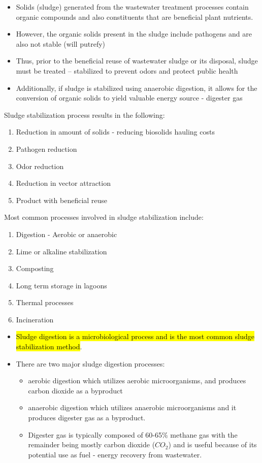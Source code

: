 \documentclass{article}
\begin{document}
		\begin{itemize}
		\item Solids (sludge) generated from the wastewater treatment processes contain organic compounds and also constituents that are beneficial plant nutrients. 
		\item However, the organic solids present in the sludge include pathogens and are also not stable (will putrefy)
		\item Thus, prior to the beneficial reuse of wastewater sludge or its disposal, sludge must be treated – stabilized to prevent odors and protect public health
		\item Additionally, if sludge is stabilized using anaerobic digestion, it  allows for the conversion of organic solids to yield valuable energy source - digester gas
		\end{itemize}
Sludge stabilization process results in the following:
		\begin{enumerate}
		\item Reduction in amount of solids - reducing biosolids hauling costs
		\item Pathogen reduction
		\item Odor reduction
		\item Reduction in vector attraction
		\item Product with beneficial reuse
		\end{enumerate}

Most common processes involved in sludge stabilization include:

		\begin{enumerate}
		\item Digestion - Aerobic or anaerobic
		\item Lime or alkaline stabilization
		\item Composting
		\item Long term storage in lagoons
		\item Thermal processes
		\item Incineration
		\end{enumerate}
		\begin{itemize}
		\item \hl{Sludge digestion is a microbiological process and is the most common sludge stabilization method}.
		\item There are two major sludge digestion processes:
			\begin{itemize}
			\item aerobic digestion which utilizes aerobic microorganisms, and produces carbon dioxide as a byproduct
			\item anaerobic digestion which utilizes anaerobic microorganisms and it produces digester gas as a byproduct.
			\item Digester gas is typically composed of 60-65\% methane gas with the remainder being mostly carbon dioxide ($CO_2$) and is useful because of its potential use as fuel - energy recovery from wastewater.
			\end{itemize}
		\end{itemize}
\newpage
\end{document}
